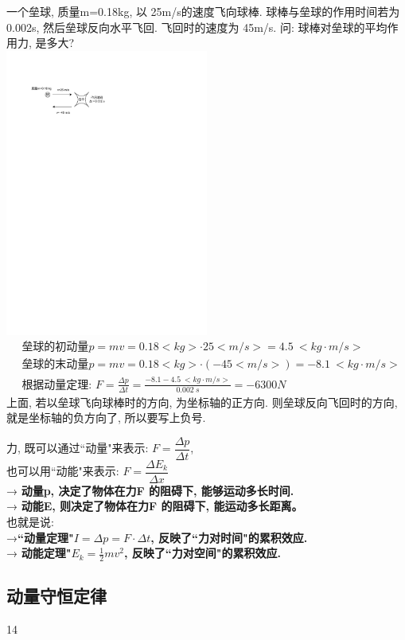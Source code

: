 \documentclass[UTF8]{ctexart}
\begin{document}
\begin{myEnvSample}
一个垒球, 质量m=0.18kg, 以 25m/s的速度飞向球棒. 球棒与垒球的作用时间若为0.002s, 然后垒球反向水平飞回. 飞回时的速度为 45m/s. 问: 球棒对垒球的平均作用力, 是多大? \\
\includegraphics[width=0.5\textwidth]{img/0106.pdf} 
\begin{align*}
		&\text{垒球的初动量}p=mv=0.18<kg>\cdot 25<m/s>=4.5\ <kg·m/s>\\
	&\text{垒球的末动量}p=mv=0.18<kg>\cdot (-45<m/s>)=-8.1\ <kg·m/s>\\
	&\text{根据动量定理:\ }F=\frac{\varDelta p}{\varDelta t}=\frac{-8.1-4.5\ <kg·m/s>}{0.002\ s}=-6300N	
\end{align*}
上面, 若以垒球飞向球棒时的方向, 为坐标轴的正方向. 则垒球反向飞回时的方向, 就是坐标轴的负方向了, 所以要写上负号.
\end{myEnvSample}


力, 既可以通过``动量"来表示: $F=\dfrac{\varDelta p}{\varDelta t} $, \\
也可以用``动能"来表示: $F=\dfrac{\varDelta E_k}{\varDelta x}$ \\

→ \textbf{动量p, 决定了物体在力F 的阻碍下, 能够运动多长时间.} \\
→\textbf{ 动能E, 则决定了物体在力F 的阻碍下, 能运动多长距离。}\\
也就是说: \\
→\textbf{``动量定理"$I=\varDelta p=F\cdot \varDelta t$, 反映了``力对时间"的累积效应.} \\
→ \textbf{动能定理"$E_k=\frac{1}{2}mv^2$, 反映了``力对空间"的累积效应.} \\


\vspace{1em} 


\subsection{动量守恒定律}














14



		
		
	
	
\end{document}
